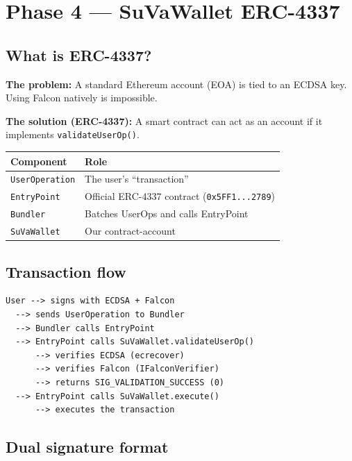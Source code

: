 \documentclass[11pt,a4paper]{article}
\begin{document}
\section{Phase 4 --- SuVaWallet ERC-4337}

\subsection{What is ERC-4337?}

\textbf{The problem:} A standard Ethereum account (EOA) is tied to an ECDSA key. Using Falcon natively is impossible.

\textbf{The solution (ERC-4337):} A smart contract can act as an account if it implements \texttt{validateUserOp()}.

\begin{center}
\begin{tabular}{ll}
\toprule
\textbf{Component} & \textbf{Role} \\
\midrule
\texttt{UserOperation} & The user's ``transaction'' \\
\texttt{EntryPoint} & Official ERC-4337 contract (\texttt{0x5FF1...2789}) \\
\texttt{Bundler} & Batches UserOps and calls EntryPoint \\
\texttt{SuVaWallet} & Our contract-account \\
\bottomrule
\end{tabular}
\end{center}

\subsection{Transaction flow}

\begin{lstlisting}
User --> signs with ECDSA + Falcon
  --> sends UserOperation to Bundler
  --> Bundler calls EntryPoint
  --> EntryPoint calls SuVaWallet.validateUserOp()
      --> verifies ECDSA (ecrecover)
      --> verifies Falcon (IFalconVerifier)
      --> returns SIG_VALIDATION_SUCCESS (0)
  --> EntryPoint calls SuVaWallet.execute()
      --> executes the transaction
\end{lstlisting}

\subsection{Dual signature format}
\end{document}

